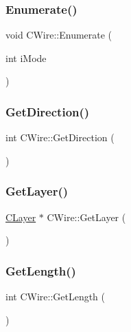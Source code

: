 \mbox{\label{classCWire_aa9ee88d6fd7117d3029c5a910c7957af}} 
\subsubsection{\texorpdfstring{Enumerate()}{Enumerate()}}
{\footnotesize\ttfamily void C\+Wire\+::\+Enumerate (\begin{DoxyParamCaption}\item[{int}]{i\+Mode }\end{DoxyParamCaption})}

\mbox{\label{classCWire_a737e918e2752d29ef32db9bc4648cb90}} 
\subsubsection{\texorpdfstring{GetDirection()}{GetDirection()}}
{\footnotesize\ttfamily int C\+Wire\+::\+Get\+Direction (\begin{DoxyParamCaption}{ }\end{DoxyParamCaption})}

\mbox{\label{classCWire_a828800be53e43a40999877e9a56f8c20}} 
\subsubsection{\texorpdfstring{GetLayer()}{GetLayer()}}
{\footnotesize\ttfamily \mbox{\hyperlink{classCLayer}{C\+Layer}} $\ast$ C\+Wire\+::\+Get\+Layer (\begin{DoxyParamCaption}{ }\end{DoxyParamCaption})}

\mbox{\label{classCWire_a063474510062c4cd858fb5bfc04daffb}} 
\subsubsection{\texorpdfstring{GetLength()}{GetLength()}}
{\footnotesize\ttfamily int C\+Wire\+::\+Get\+Length (\begin{DoxyParamCaption}{ }\end{DoxyParamCaption})}

